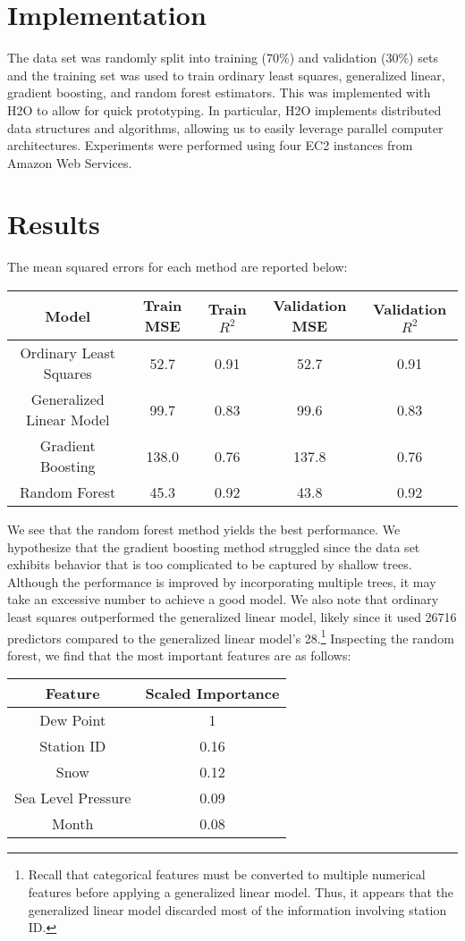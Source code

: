 \documentclass[letterpaper]{article}
\begin{document}
\section{Implementation}
The data set was randomly split into training (70\%) and validation
(30\%) sets and the training set was used to train ordinary least
squares, generalized linear, gradient boosting, and random forest
estimators. This was implemented with H2O to allow for quick
prototyping. In particular, H2O implements distributed data structures
and algorithms, allowing us to easily leverage parallel computer
architectures. Experiments were performed using four EC2 instances
from Amazon Web Services.

\section{Results}
The mean squared errors for each method are reported below:
\begin{table}[H]
  \centering
  \begin{tabular}{c|cccc}
    Model & Train MSE & Train \(R^2\) & Validation MSE & Validation \(R^2\) \\ \hline
    Ordinary Least Squares & 52.7 & 0.91 & 52.7 & 0.91 \\
    Generalized Linear Model & 99.7 & 0.83 & 99.6 & 0.83\\
    Gradient Boosting & 138.0 & 0.76 & 137.8 & 0.76 \\
    Random Forest & 45.3 & 0.92 & 43.8 & 0.92
  \end{tabular}
\end{table}
\noindent
We see that the random forest method yields the best performance. We
hypothesize that the gradient boosting method struggled since the data
set exhibits behavior that is too complicated to be captured by
shallow trees. Although the performance is improved by incorporating
multiple trees, it may take an excessive number to achieve a good
model. We also note that ordinary least squares outperformed the
generalized linear model, likely since it used 26716 predictors
compared to the generalized linear model's 28.\footnote{Recall that
  categorical features must be converted to multiple numerical
  features before applying a generalized linear model. Thus, it
  appears that the generalized linear model discarded most of the
  information involving station ID.} Inspecting the random forest, we
find that the most important features are as follows:
\begin{table}[H]
  \centering
  \begin{tabular}{c|c}
    Feature & Scaled Importance \\ \hline
    Dew Point & 1 \\
    Station ID & 0.16 \\
    Snow & 0.12 \\
    Sea Level Pressure & 0.09 \\
    Month & 0.08
  \end{tabular}
\end{table}
\end{document}
